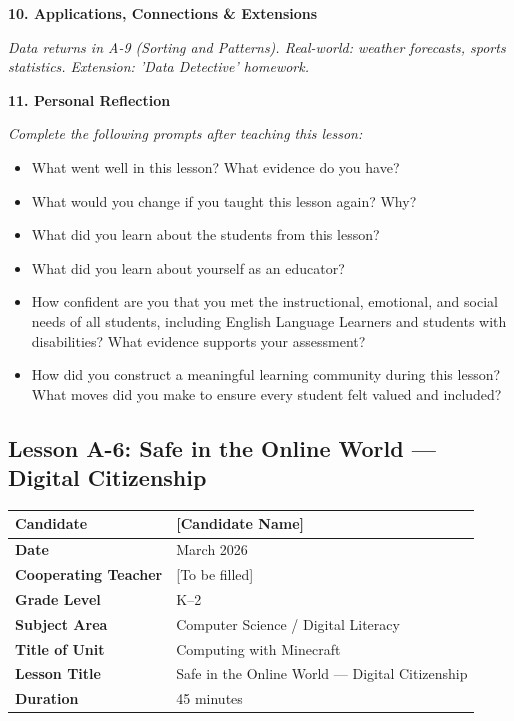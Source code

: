 \documentclass[11pt,letterpaper]{article}
\begin{document}
\textbf{10. Applications, Connections \& Extensions}

\textit{Data returns in A-9 (Sorting and Patterns). Real-world: weather forecasts, sports statistics. Extension: 'Data Detective' homework.}

\textbf{11. Personal Reflection}

\textit{Complete the following prompts after teaching this lesson:}

\begin{itemize}
  \item What went well in this lesson? What evidence do you have?

  \item What would you change if you taught this lesson again? Why?

  \item What did you learn about the students from this lesson?

  \item What did you learn about yourself as an educator?

  \item How confident are you that you met the instructional, emotional, and social needs of all students, including English Language Learners and students with disabilities? What evidence supports your assessment?

  \item How did you construct a meaningful learning community during this lesson? What moves did you make to ensure every student felt valued and included?
\end{itemize}

\newpage
\subsection{Lesson A-6: Safe in the Online World --- Digital Citizenship}
\label{sub:LessonA6SafeintheOnlineWorldDigitalCitizenship}

\begin{longtable}{|L{0.28\textwidth}|L{0.65\textwidth}|}
\hline
\textbf{Candidate}  & [Candidate Name]  \\
\hline
\textbf{Date}  & March 2026  \\
\hline
\textbf{Cooperating Teacher}  & [To be filled]  \\
\hline
\textbf{Grade Level}  & K--2  \\
\hline
\textbf{Subject Area}  & Computer Science / Digital Literacy  \\
\hline
\textbf{Title of Unit}  & Computing with Minecraft  \\
\hline
\textbf{Lesson Title}  & Safe in the Online World --- Digital Citizenship  \\
\hline
\textbf{Duration}  & 45 minutes  \\
\hline
\end{longtable}
\end{document}
